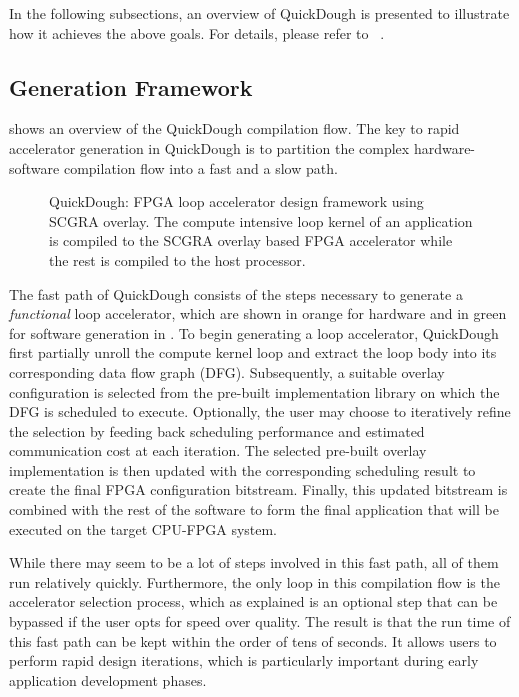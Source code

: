 In the following subsections, an overview of QuickDough is presented to illustrate how it achieves the above goals.  For details, please refer to ~\cite{Lin:2012:EDC:2460216.2460227,Liu:2015:FSP}.

\subsection{Generation Framework}
 shows an overview of the QuickDough compilation flow.
The key to rapid accelerator generation in QuickDough is to partition the complex hardware-software compilation flow into a fast and a slow path. 

\begin{figure}
    \caption{QuickDough: FPGA loop accelerator design framework using 
        SCGRA overlay. The compute intensive loop kernel of an 
        application is compiled to the SCGRA overlay based FPGA
    accelerator while the rest is compiled to the host processor.}
    \label{fig:framework}
\end{figure}

The fast path of QuickDough consists of the steps necessary to generate a \emph{functional} loop accelerator, which are shown in orange for hardware and in green for software generation in .
To begin generating a loop accelerator, QuickDough first partially unroll the compute kernel loop and extract the loop body into its corresponding data flow graph (DFG).
Subsequently, a suitable overlay configuration is selected from the pre-built implementation library on which the DFG is scheduled to execute.
Optionally, the user may choose to iteratively refine the selection by feeding back scheduling performance and estimated communication cost at each iteration.
The selected pre-built overlay implementation is then updated with the corresponding scheduling result to create the final FPGA configuration bitstream.
Finally, this updated bitstream is combined with the rest of the software to form the final application that will be executed on the target CPU-FPGA system. 

While there may seem to be a lot of steps involved in this fast path, all of them run relatively quickly.
Furthermore, the only loop in this compilation flow is the accelerator selection process, which as explained is an optional step that can be bypassed if the user opts for speed over quality.
The result is that the run time of this fast path can be kept within the order of tens of seconds.
It allows users to perform rapid design iterations, which is particularly important during early application development phases.

